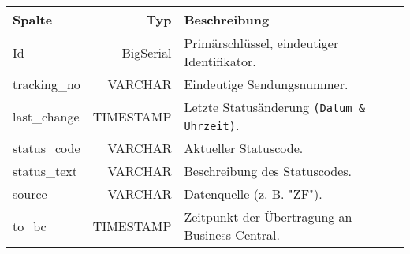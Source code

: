 \label{bcTracking}
\begin{tabular}{lrl} %
    \hline
    \rowcolor{heading}\textbf{Spalte} & \textbf{Typ} & \textbf{Beschreibung} \\
    \hline
    Id & BigSerial & Primärschlüssel, eindeutiger Identifikator. \\
    \rowcolor{odd}tracking\_no & VARCHAR & Eindeutige Sendungsnummer. \\
    last\_change & TIMESTAMP & Letzte Statusänderung \texttt{(Datum \& Uhrzeit)}. \\
    \rowcolor{odd}status\_code & VARCHAR & Aktueller Statuscode. \\
    status\_text & VARCHAR & Beschreibung des Statuscodes. \\
    \rowcolor{odd}source & VARCHAR & Datenquelle (z. B. "ZF"). \\
    to\_bc & TIMESTAMP & Zeitpunkt der Übertragung an Business Central. \\
    \hline
\end{tabular}
    
